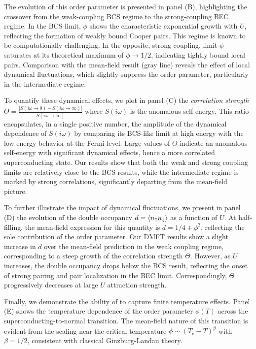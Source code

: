 \documentclass[edipack2.tex]{subfiles}
\begin{document}
The evolution of this order parameter is presented in panel (B), 
highlighting the crossover from the weak-coupling BCS regime to the 
strong-coupling BEC regime. In the BCS limit, $\phi$ shows the 
characteristic exponential growth with $U$, reflecting the formation 
of weakly bound Cooper pairs. This regime is known to be 
computationally challenging. In the opposite, strong-coupling, limit 
$\phi$ saturates at its theoretical maximum of $\phi \rightarrow 1/2$, 
indicating tightly bound local pairs. Comparison with the mean-field result 
(gray line) reveals the effect of local dynamical fluctuations, which 
slightly suppress the order parameter, particularly in the intermediate 
regime.



To quantify these dynamical effects, we plot in panel (C) the 
\emph{correlation strength}
$\Theta=\frac{|S(i\omega\to 0)-S(i\omega\to\infty)|}{S(i\omega\to\infty)}$
where $S(i\omega)$ is the anomalous self-energy.
This ratio encapsulates, in a single positive number, %
the amplitude of the dynamical dependence of $S(i\omega)$ by comparing its 
BCS-like limit at high energy with the low-energy behavior at the Fermi level. 
Large values of $\Theta$ indicate an anomalous self-energy with 
significant dynamical effects, hence a more correlated superconducting state.
Our results show that both the weak 
and strong coupling limits are relatively close to the BCS results, 
while the intermediate regime is marked by strong 
correlations, significantly departing from the mean-field picture.

To further illustrate the impact of dynamical fluctuations, we 
present in panel (D) the evolution of the double occupancy 
$d = \langle n_\uparrow n_\downarrow \rangle$ as a function of $U$. At half-filling, 
the mean-field expression for this quantity is $d = 1/4 + \phi^2$, 
reflecting the sole contribution of the order parameter. Our DMFT 
results show a slight increase in $d$ over the mean-field prediction 
in the weak coupling regime, corresponding to a steep growth of
the correlation strength $\Theta$. 
However, as $U$ increases, the double occupancy drops below 
the BCS result, reflecting the onset of strong pairing and 
pair localization in the BEC limit. Correspondingly, $\Theta$ 
progressively decreases at large $U$ attraction strength.

Finally, we demonstrate the ability of \NAME to capture finite 
temperature effects. Panel (E) shows the temperature dependence of 
the order parameter $\phi(T)$ across the superconducting-to-normal 
transition. The mean-field nature of this transition is evident from 
the scaling near the critical temperature 
$\phi \sim (T_\mathrm{c} - T)^\beta$ with $\beta = 1/2$, consistent 
with classical Ginzburg-Landau theory.
\end{document}
